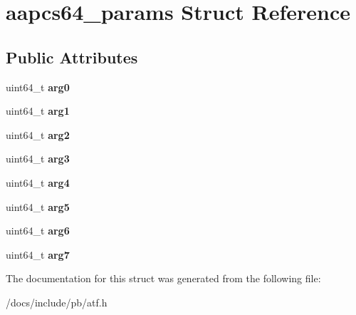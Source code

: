 \hypertarget{structaapcs64__params}{}\section{aapcs64\+\_\+params Struct Reference}
\label{structaapcs64__params}
\subsection*{Public Attributes}
\begin{DoxyCompactItemize}
\item 
\mbox{\label{structaapcs64__params_a5465d94b97b821d931eebebdaacbbd1d}} 
uint64\+\_\+t {\bfseries arg0}
\item 
\mbox{\label{structaapcs64__params_ae1845ff22423889f0337943a60cdfc56}} 
uint64\+\_\+t {\bfseries arg1}
\item 
\mbox{\label{structaapcs64__params_afe7464e0da05bf55e33229a08570046b}} 
uint64\+\_\+t {\bfseries arg2}
\item 
\mbox{\label{structaapcs64__params_a062d81cb8b343198c4a168efd945899d}} 
uint64\+\_\+t {\bfseries arg3}
\item 
\mbox{\label{structaapcs64__params_abc94add19e297928c23867bef538d8bb}} 
uint64\+\_\+t {\bfseries arg4}
\item 
\mbox{\label{structaapcs64__params_a0004d07042e59954e708315dbd951ed9}} 
uint64\+\_\+t {\bfseries arg5}
\item 
\mbox{\label{structaapcs64__params_ab19c731bcf60b31d24d2f6b92c0bfd6a}} 
uint64\+\_\+t {\bfseries arg6}
\item 
\mbox{\label{structaapcs64__params_a3606694f886757c140deef1b33b81856}} 
uint64\+\_\+t {\bfseries arg7}
\end{DoxyCompactItemize}


The documentation for this struct was generated from the following file\+:\begin{DoxyCompactItemize}
\item 
/docs/include/pb/atf.\+h\end{DoxyCompactItemize}
